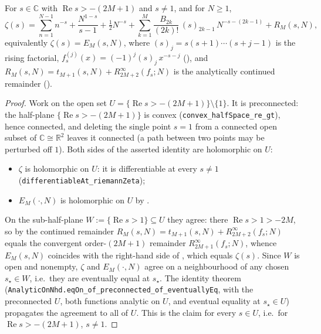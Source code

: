 \begin{theorem}
\label{thm:zeta_em}
\leanok
{}
For $s \in \mathbb{C}$ with $\operatorname{Re} s > -(2M+1)$ and $s \neq 1$, and for
$N \ge 1$,
\[
  \zeta(s) = \sum_{n=1}^{N-1} n^{-s} + \frac{N^{1-s}}{s-1} + \tfrac12 N^{-s}
    + \sum_{k=1}^{M} \frac{B_{2k}}{(2k)!}\,(s)_{2k-1}\,N^{-s-(2k-1)} + R_{M}(s,N),
\]
equivalently $\zeta(s) = E_M(s,N)$, where $(s)_{j} = s(s+1)\cdots(s+j-1)$ is the rising
factorial, $f_s^{(j)}(x) = (-1)^j (s)_j\, x^{-s-j}$ (), and
$R_M(s,N) = t_{M+1}(s,N) + R^{\infty}_{2M+2}(f_s;N)$ is the analytically continued remainder
().
\end{theorem}

\begin{proof}
\leanok
{}
Work on the open set $U = \{\operatorname{Re} s > -(2M+1)\}\setminus\{1\}$. It is
preconnected: the half-plane $\{\operatorname{Re} s > -(2M+1)\}$ is convex
(\texttt{convex\_halfSpace\_re\_gt}), hence connected, and deleting the single point $s=1$
from a connected open subset of $\mathbb{C} \cong \mathbb{R}^2$ leaves it connected (a path
between two points may be perturbed off $1$). Both sides of the asserted identity are
holomorphic on $U$:
\begin{itemize}
\item $\zeta$ is holomorphic on $U$: it is differentiable at every $s \ne 1$
  (\texttt{differentiableAt\_riemannZeta});
\item $E_M(\cdot,N)$ is holomorphic on $U$ by .
\end{itemize}
On the sub-half-plane $W := \{\operatorname{Re} s > 1\} \subseteq U$ they agree: there
$\operatorname{Re} s > 1 > -2M$, so by  the continued remainder
$R_M(s,N) = t_{M+1}(s,N) + R^{\infty}_{2M+2}(f_s;N)$ equals the convergent order-$(2M+1)$
remainder $R^{\infty}_{2M+1}(f_s;N)$, whence $E_M(s,N)$ coincides with the right-hand side of
, which equals $\zeta(s)$. Since $W$ is open and nonempty, $\zeta$ and
$E_M(\cdot,N)$ agree on a neighbourhood of any chosen $s_\star \in W$, i.e.\ they are
eventually equal at $s_\star$. The identity theorem
(\texttt{AnalyticOnNhd.eqOn\_of\_preconnected\_of\_eventuallyEq}, with the preconnected $U$,
both functions analytic on $U$, and eventual equality at $s_\star \in U$) propagates the
agreement to all of $U$. This is the claim for every $s \in U$, i.e.\ for
$\operatorname{Re} s > -(2M+1)$, $s \ne 1$.
\end{proof}

